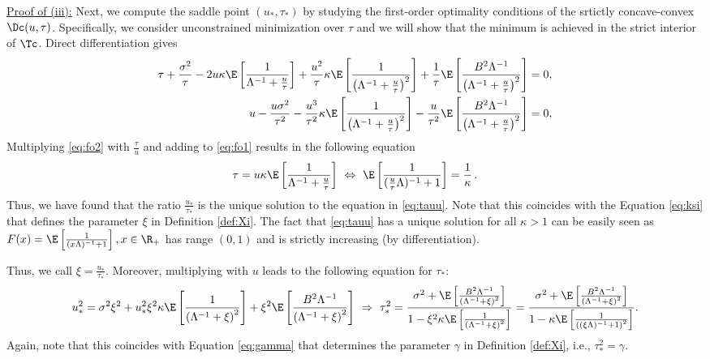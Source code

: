 \vspace{5pt}
\noindent\underline{Proof of (iii):} 
Next, we compute the saddle point $(u_*,\tau_*)$ by studying the first-order optimality conditions of the srtictly concave-convex $\Dc(u,\tau)$. Specifically, we consider unconstrained minimization over $\tau$ and we will show that the minimum is achieved in the strict interior of $\Tc$. Direct differentiation gives
\begin{subequations}
\begin{align}
{\tau} + \frac{\sigma^2}{\tau} - 2u\kappa\E\left[ \frac{1}{\Lambda^{-1}+\frac{u}{\tau}} \right] + \frac{u^2}{\tau}\kappa \E\left[ \frac{1}{\left(\Lambda^{-1}+\frac{u}{\tau}\right)^2}\right] + \frac{1}{\tau}\E\left[\frac{B^2\Lambda^{-1}}{\left(\Lambda^{-1}+\frac{u}{\tau}\right)^2}\right] &= 0, \label{eq:fo1}\\
{u} - \frac{u\sigma^2}{\tau^2} - \frac{u^3}{\tau^2}\kappa \E\left[ \frac{1}{\left(\Lambda^{-1} + \frac{u}{\tau}\right)^2}\right] - \frac{u}{\tau^2} \E\left[\frac{B^2\Lambda^{-1}}{\left(\Lambda^{-1}+\frac{u}{\tau}\right)^2}\right] &= 0,\label{eq:fo2}
\end{align}
\end{subequations}
Multiplying \eqref{eq:fo2}  with $\frac{\tau}{u}$ and adding to \eqref{eq:fo1} results in the following equation
\begin{align}
\tau = u\kappa\E\left[ \frac{1}{\Lambda^{-1}+\frac{u}{\tau}} \right] ~\Leftrightarrow ~
\E\left[ \frac{1}{(\frac{u}{\tau}\Lambda)^{-1}+1} \right] = \frac{1}{\kappa} \label{eq:tauu}\,.
\end{align}
Thus, we have found that the ratio $\frac{u_*}{\tau_*}$ is the unique solution to the equation in \eqref{eq:tauu}. Note that this coincides with the Equation \eqref{eq:ksi} that defines the parameter $\xi$ in Definition \ref{def:Xi}.  The fact that \eqref{eq:tauu} has a unique solution for all $\kappa>1$ can be easily seen as $F(x)=\E\left[ \frac{1}{(x\Lambda)^{-1}+1} \right], x\in\R_+$ has range $(0,1)$ and is strictly increasing (by differentiation). 


Thus, we call $\xi=\frac{u_*}{\tau_*}$. Moreover, multiplying \label{eq:fo2} with $u$ leads to the following equation for $\tau_*$:
\begin{align}
u_*^2 = \sigma^2\xi^2 + u_*^2 \xi^2  \kappa \E\left[ \frac{1}{\left(\Lambda^{-1} +\xi\right)^2}\right] + \xi^2  \E\left[ \frac{B^2\Lambda^{-1}}{\left(\Lambda^{-1} + \xi\right)^2}\right] ~\Rightarrow~ \tau_*^2 = \frac{\sigma^2 + \E\left[ \frac{B^2\Lambda^{-1}}{\left(\Lambda^{-1} + \xi\right)^2}\right]}{1-\xi^2\kappa \E\left[ \frac{1}{\left(\Lambda^{-1} +\xi\right)^2}\right]} =  \frac{\sigma^2 + \E\left[ \frac{B^2\Lambda^{-1}}{\left(\Lambda^{-1} + \xi\right)^2}\right]}{1-\kappa \E\left[ \frac{1}{\left((\xi\Lambda)^{-1} +1\right)^2}\right]}.
\end{align}
{Again, note that this coincides with Equation \eqref{eq:gamma} that determines the parameter $\gamma$ in Definition \ref{def:Xi}, i.e., $\tau_*^2 = \gamma.$ }

